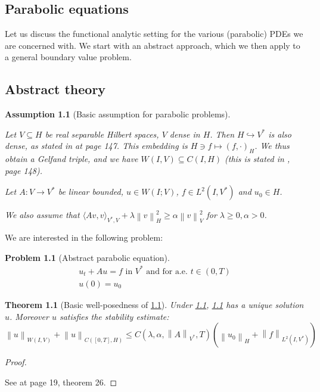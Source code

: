 \documentclass[english,a4paper,9pt,oneside]{scrbook}	%
\theoremstyle{break}
\newtheorem{thm}[equation]{Theorem}
\newtheorem{ass}[equation]{Assumption}
\newtheorem{pb}[equation]{Problem}
\newenvironment{mproof}[1][\proofname]{%
  \begin{proof}[#1]$ $\par\nobreak\ignorespaces
}{%
  \end{proof}
}
\renewcommand*{\proofname}{Proof}
\theoremstyle{remark}
\newcommand{\norm}[1]{\left\lVert#1\right\rVert}
\newcommand{\HN}[1]{\norm{#1}_{H}}
\newcommand{\VN}[1]{\norm{#1}_{V}}
\newcommand{\VSN}[1]{\norm{#1}_{V^*}}
\begin{document}
\begin{appendices}
\chapter{Parabolic equations}
\label{chap:parab_eq}

Let us discuss the functional analytic setting for the various (parabolic) PDEs we are concerned with. We start with an abstract approach, which we then apply to a general boundary value problem.

\section{Abstract theory}

\begin{ass}[Basic assumption for parabolic problems]
\label{ass:basic_par}

Let $V\subseteq H$ be real separable Hilbert spaces, $V$ dense in $H$. Then $H\hookrightarrow V^*$ is also dense, as stated in \cite{trol} at page 147. This embedding is $H \ni f \mapsto (f, \cdot )_H$. We thus obtain a Gelfand triple, and we have $W(I,V)\subseteq C(I,H)$ (this is stated in \cite{trol}, page 148).

Let $A:V\rightarrow V^* $ be linear bounded, $u \in W(I;V)$, $f \in L^2(I,V^*)$ and $u_0 \in H$.

We also assume that $\langle Av, v \rangle_{V^*,V}+ \lambda \HN{v}^2\geq \alpha \VN{v}^2$ for $\lambda \geq 0, \alpha >0$.
\end{ass}

We are interested in the following problem:

\begin{pb}[Abstract parabolic equation]
\label{eqn:general_parabolic}
\begin{align}
	u_t+Au=f \text{ in }V^* \text{ and for a.e. } t \in (0,T)\\
	u(0)=u_0
\end{align}
\end{pb}

\begin{thm}[Basic well-posedness of \cref{eqn:general_parabolic}]
\label{thm:well_pos_parabolic}
Under \cref{ass:basic_par}, \cref{eqn:general_parabolic} has a unique solution $u$. Moreover $u$ satisfies the stability estimate:
\begin{equation}
	\label{eqn:en_est}
	\norm{u}_{W(I,V)} + \norm{u}_{C([0,T],H)}\leq C(\lambda, \alpha, \VSN{A}, T)(\HN{u_0}+\norm{f}_{L^2(I,V^*)})
\end{equation} 
\end{thm}
\begin{mproof}
See \cite{gilardi} at page 19, theorem 26.
\end{mproof}


\end{appendices}
\end{document}
